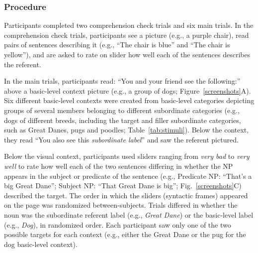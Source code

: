 \documentclass[10pt,letterpaper]{article}
\begin{document}
\subsubsection{Procedure}
Participants completed two comprehension check trials and six main trials. In the comprehension check trials, participants see a picture (e.g., a purple chair), read pairs of sentences describing it (e.g., ``The chair is blue'' and ``The chair is yellow''), and are asked to rate on slider how well each of the sentences describes the referent.

In the main trials, participants read: ``You and your friend see the following:'' above a basic-level context picture (e.g., a group of dogs; Figure~\ref{screenshots}A). 
Six different basic-level contexts were created from basic-level categories depicting groups of several members belonging to different subordinate categories (e.g., dogs of different breeds, including the target and filler subordinate categories, such as Great Danes, pugs and poodles; Table~\ref{tab:stimuli}).
Below the context, they read ``You also see this \emph{subordinate label}'' and saw the referent pictured.

Below the visual context, participants used sliders ranging from \textit{very bad} to \textit{very well} to rate how well each of the two sentences differing in whether the NP appears in the subject or predicate of the sentence (e.g., Predicate NP: ``That's a big Great Dane''; Subject NP: ``That Great Dane is big''; Fig.~\ref{screenshots}C) described the target.
The order in which the sliders (syntactic frames) appeared on the page was randomized between-subjects. 
Trials differed in whether the noun was the subordinate referent label (e.g., \emph{Great Dane}) or the basic-level label (e.g., \emph{Dog}), in randomized order. Each participant saw only one of the two possible targets for each context (e.g., either the Great Dane or the pug for the dog basic-level context).
\end{document}
